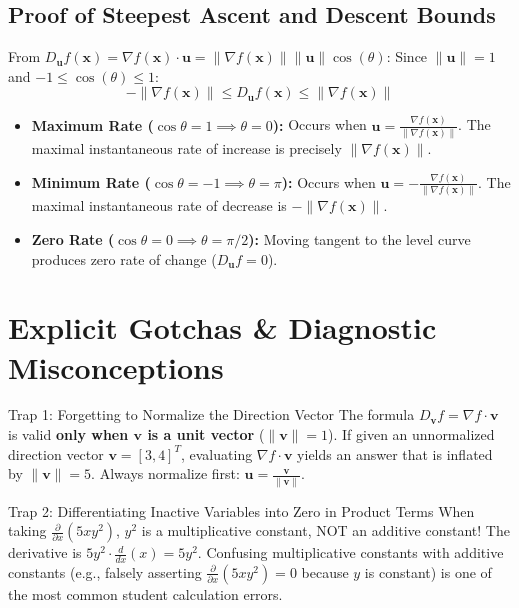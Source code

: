 \subsection{Proof of Steepest Ascent and Descent Bounds}

From $D_{\mathbf{u}} f(\mathbf{x}) = \nabla f(\mathbf{x}) \cdot \mathbf{u} = \|\nabla f(\mathbf{x})\| \|\mathbf{u}\| \cos(\theta)$:
Since $\|\mathbf{u}\| = 1$ and $-1 \le \cos(\theta) \le 1$:
\begin{equation}
-\|\nabla f(\mathbf{x})\| \le D_{\mathbf{u}} f(\mathbf{x}) \le \|\nabla f(\mathbf{x})\|
\end{equation}
\begin{itemize}
    \item \textbf{Maximum Rate ($\cos\theta = 1 \implies \theta = 0$):} Occurs when $\mathbf{u} = \frac{\nabla f(\mathbf{x})}{\|\nabla f(\mathbf{x})\|}$. The maximal instantaneous rate of increase is precisely $\|\nabla f(\mathbf{x})\|$.
    \item \textbf{Minimum Rate ($\cos\theta = -1 \implies \theta = \pi$):} Occurs when $\mathbf{u} = -\frac{\nabla f(\mathbf{x})}{\|\nabla f(\mathbf{x})\|}$. The maximal instantaneous rate of decrease is $-\|\nabla f(\mathbf{x})\|$.
    \item \textbf{Zero Rate ($\cos\theta = 0 \implies \theta = \pi/2$):} Moving tangent to the level curve produces zero rate of change ($D_{\mathbf{u}} f = 0$).
\end{itemize}

\section{Explicit Gotchas \& Diagnostic Misconceptions}

\begin{trapbox}{Trap 1: Forgetting to Normalize the Direction Vector}
The formula $D_{\mathbf{v}} f = \nabla f \cdot \mathbf{v}$ is valid \textbf{only when $\mathbf{v}$ is a unit vector} ($\|\mathbf{v}\| = 1$). If given an unnormalized direction vector $\mathbf{v} = [3, 4]^T$, evaluating $\nabla f \cdot \mathbf{v}$ yields an answer that is inflated by $\|\mathbf{v}\| = 5$. Always normalize first: $\mathbf{u} = \frac{\mathbf{v}}{\|\mathbf{v}\|}$.
\end{trapbox}

\begin{trapbox}{Trap 2: Differentiating Inactive Variables into Zero in Product Terms}
When taking $\frac{\partial}{\partial x}(5 x y^2)$, $y^2$ is a multiplicative constant, NOT an additive constant! The derivative is $5 y^2 \cdot \frac{d}{dx}(x) = 5 y^2$. Confusing multiplicative constants with additive constants (e.g., falsely asserting $\frac{\partial}{\partial x}(5 x y^2) = 0$ because $y$ is constant) is one of the most common student calculation errors.
\end{trapbox}

